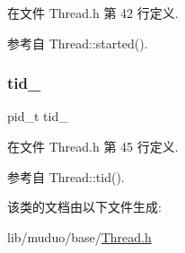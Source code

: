 在文件 Thread.\+h 第 42 行定义.



参考自 Thread\+::started().

\mbox{\label{classmuduo_1_1Thread_ad3941d2816d56fc00acc575589d1bf4d}} 
\subsubsection{\texorpdfstring{tid\+\_\+}{tid\_}}
{\footnotesize\ttfamily pid\+\_\+t tid\+\_\+\hspace{0.3cm}{\ttfamily [private]}}



在文件 Thread.\+h 第 45 行定义.



参考自 Thread\+::tid().



该类的文档由以下文件生成\+:\begin{DoxyCompactItemize}
\item 
lib/muduo/base/\hyperlink{Thread_8h}{Thread.\+h}\end{DoxyCompactItemize}
